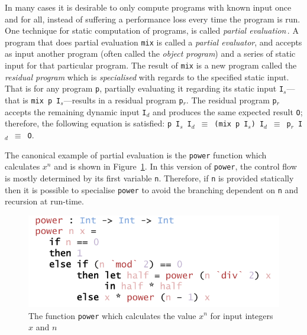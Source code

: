 \documentclass{ituthesis}
\newcommand{\ttdec}[1]{\textcolor{declared-var-color}{\texttt{#1}}}
\newcommand{\ttvar}[1]{\textcolor{local-var-color}{\texttt{#1}}}
\theoremstyle{break}
\begin{document}
In many cases it is desirable to only compute programs with known input once and for all, instead of suffering a performance loss every time the program is run.
One technique for static computation of programs, is called \textit{partial evaluation}\,\autocite{Jones:1993:PEA:153676}. A program that does partial evaluation \ttdec{mix} is called a \textit{partial evaluator}, and accepts as input another program (often called the \textit{object program}) and a series of static input for that particular program.
The result of \ttdec{mix} is a new program called the \textit{residual program} which is \textit{specialised} with regards to the specified static input.
That is for any program \ttvar{p}, partially evaluating it regarding its static input \ttvar{I$_s$}---that is \ttdec{mix}~\ttvar{p}~\ttvar{I$_s$}---results in a residual program \ttvar{p$_r$}.
The residual program \ttvar{p$_r$} accepts the remaining dynamic input \ttvar{I$_d$} and produces the same expected result \ttvar{O}; therefore, the following equation is satisfied: \ttvar{p}~\ttvar{I$_s$}~\ttvar{I$_d$}~\texttt{$\equiv$}~\texttt{(}\ttdec{mix}~\ttvar{p}~\ttvar{I$_s$}\texttt{)}~\ttvar{I$_d$}~\texttt{$\equiv$}~\ttvar{p$_r$}~\ttvar{I$_d$}~\texttt{$\equiv$}~\ttvar{O}.

The canonical example of partial evaluation \autocite{Jones:1993:PEA:153676,mogensen1997,taha2004gentle} is the \ttdec{power} function which calculates $x^n$ and is shown in Figure~\ref{fig:powexmp}.
In this version of \ttdec{power}, the control flow is mostly determined by its first variable \ttvar{n}.
Therefore, if \ttvar{n} is provided statically then it is possible to specialise \ttdec{power} to avoid the branching dependent on \ttvar{n} and recursion at run-time.

\begin{figure}[ht]
\begin{center}
    \includegraphics[scale=0.5]{Figures/PowerExample.png}
\end{center}
\caption{The function \ttdec{power} which calculates the value $x^n$ for input integers $x$ and $n$}
\label{fig:powexmp}
\end{figure}
\end{document}
